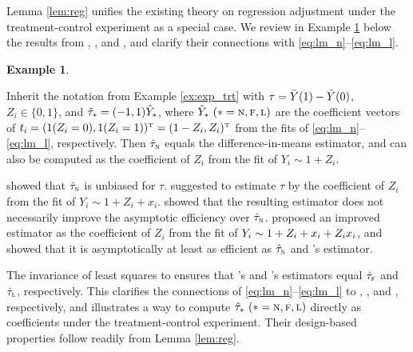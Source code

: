 \documentclass[11pt]{article}
\theoremstyle{definition}
\newtheorem{example}{Example}
\begin{document}
Lemma \ref{lem:reg} unifies the existing theory on regression adjustment under the treatment-control experiment as a special case. We review in Example \ref{ex:treatment_control} below the results from  \cite{Neyman23}, \cite{Fisher35}, and \cite{Lin13}, and clarify their connections with \eqref{eq:lm_n}--\eqref{eq:lm_l}.

\begin{example}\label{ex:treatment_control}


Inherit the notation from Example \ref{ex:exp_trt} with $\tau = \bar Y(1) - \bar Y(0)$, $Z_i \in \{0,1\}$,  and $\hat\tau_* = (-1, 1)\hat Y_*$, where $\hat Y_* \ (* =\textsc{n}, \textsc{f}, \textsc{l})$ are the coefficient vectors of $t_i = (1(Z_i = 0), 1(Z_i = 1))^{ \mathrm{\scriptscriptstyle T} } = (1-Z_i, Z_i)^{ \mathrm{\scriptscriptstyle T} }$ from the \olss fits of \eqref{eq:lm_n}--\eqref{eq:lm_l}, respectively. 
Then $\hat\tau_{\textsc{n}}$ equals the difference-in-means estimator, and can also be computed as the coefficient of $Z_i$ from the \olss fit of $
Y_i \sim 1 + Z_i$. 

\cite{Neyman23} showed that $\hat\tau_{\textsc{n}}$ is unbiased for $\tau$. 
\citet{Fisher35} suggested to estimate $\tau$ by the coefficient of $Z_i$ from the \olss fit of 
$Y_i \sim 1 + Z_i + x_i$. 
%
\cite{Freedman08a} showed that the resulting estimator does not necessarily improve the asymptotic efficiency over $\hat\tau_{\textsc{n}}$.
%
\citet{Lin13} proposed an improved estimator
as the coefficient of $Z_i$ from the \olss fit of 
$
Y_i \sim  1 + Z_i +  x_i  + Z_i  x_i $, and showed that it is asymptotically at least as efficient as $\hat\tau_{\textsc{n}}$ and \cite{Fisher35}'s estimator.

The invariance of least squares to {\ndt} ensures that \cite{Fisher35}'s and \cite{Lin13}'s estimators equal $\hat\tau_{\textsc{f}}$ and $\hat\tau_{\textsc{l}}$, respectively.
This clarifies the connections of \eqref{eq:lm_n}--\eqref{eq:lm_l} to \cite{Neyman23}, \cite{Fisher35}, and \cite{Lin13}, respectively, and illustrates a way to compute $\hts \ (\nfl)$ directly as \olss coefficients under the treatment-control experiment. 
%
Their design-based properties follow readily from Lemma \ref{lem:reg}.
\end{example}
\end{document}
